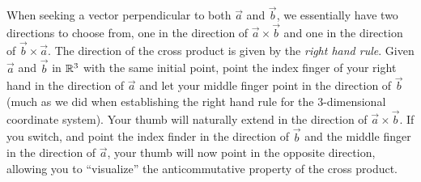 \documentclass{ximera}
\begin{document}
When seeking a vector perpendicular to both $\vec a$ and $\vec b$, we
essentially have two directions to choose from, one in the direction
of $\vec{a}\times\vec{b}$ and one in the direction of
$\vec{b}\times\vec{a}$.  The direction of the cross product is given
by the \textit{right hand rule}.  Given $\vec{a}$ and $\vec{b}$ in
$\mathbb R^3$ with the same initial point, point the index finger of your
right hand in the direction of $\vec{a}$ and let your middle finger
point in the direction of $\vec{b}$ (much as we did when establishing
the right hand rule for the 3-dimensional coordinate system). Your
thumb will naturally extend in the direction of
$\vec{a}\times\vec{b}$.  If you switch, and point the index finder in
the direction of $\vec{b}$ and the middle finger in the direction of
$\vec{a}$, your thumb will now point in the opposite direction,
allowing you to ``visualize'' the anticommutative property of the
cross product.
\end{document}
